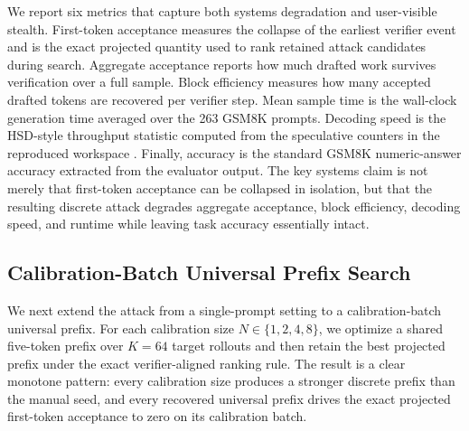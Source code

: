 We report six metrics that capture both systems degradation and user-visible
stealth. First-token acceptance measures the collapse of the earliest verifier
event and is the exact projected quantity used to rank retained attack
candidates during search. Aggregate acceptance reports how much drafted work
survives verification over a full sample. Block efficiency measures how many
accepted drafted tokens are recovered per verifier step. Mean sample time is
the wall-clock generation time averaged over the 263 GSM8K prompts. Decoding
speed is the HSD-style throughput statistic computed from the speculative
counters in the reproduced workspace \citep{zhou2026hsd}. Finally, accuracy is
the standard GSM8K numeric-answer accuracy extracted from the evaluator
output. The key systems claim is not merely that first-token acceptance can be
collapsed in isolation, but that the resulting discrete attack degrades
aggregate acceptance, block efficiency, decoding speed, and runtime while
leaving task accuracy essentially intact.





\subsection{Calibration-Batch Universal Prefix Search}

We next extend the attack from a single-prompt setting to a calibration-batch
universal prefix. For each calibration size $N \in \{1,2,4,8\}$, we optimize a
shared five-token prefix over $K=64$ target rollouts and then retain the best
projected prefix under the exact verifier-aligned ranking rule. The result is a
clear monotone pattern: every calibration size produces a stronger discrete
prefix than the manual seed, and every recovered universal prefix drives the
exact projected first-token acceptance to zero on its calibration batch.


